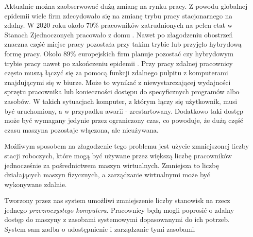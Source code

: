 \documentclass[../wstep.tex]{subfiles}
\begin{document}
Aktualnie można zaobserwować dużą zmianę na rynku pracy.
Z powodu globalnej epidemii wiele firm zdecydowało się na zmianę trybu pracy stacjonarnego na zdalny. W 2020 roku około $70\%$ pracowników zatrudnionych na pełen etat w Stanach Zjednoczonych pracowało z domu \parencite{remote-2020}.
Nawet po złagodzeniu obostrzeń znaczna część miejsc pracy pozostała przy takim trybie lub przyjęło hybrydową formę pracy. Około $89\%$ europejskich firm planuje pozostać czy hybrydowym trybie pracy nawet po zakończeniu epidemii \parencite{remote-2021}.
Przy pracy zdalnej pracownicy często muszą łączyć się za pomocą funkcji zdalnego pulpitu z komputerami znajdującymi się w biurze.
Może to wynikać z niewystarczającej wydajności sprzętu pracownika lub konieczności dostępu do specyficznych programów albo zasobów.
W takich sytuacjach komputer, z którym łączy się użytkownik, musi być uruchomiony, a w przypadku awarii - zrestartowany.
Dodatkowo taki dostęp może być wymagany jedynie przez ograniczony czas, co powoduje, że dużą część czasu maszyna pozostaje włączona, ale nieużywana.

Możliwym sposobem na złagodzenie tego problemu jest użycie zmniejszonej liczby stacji roboczych, które mogą być używane przez większą liczbę pracowników jednocześnie za pośrednictwem maszyn wirtualnych.
Zmniejsza to liczbę działających maszyn fizycznych, a zarządzanie wirtualnymi może być wykonywane zdalnie.

Tworzony przez nas system umożliwi zmniejszenie liczby stanowisk na rzecz jednego \textit{przezroczystego komputera}.
Pracownicy będą mogli poprosić o zdalny dostęp do maszyny z zasobami systemowymi dopasowanymi do ich potrzeb.
System sam zadba o udostępnienie i zarządzanie tymi zasobami.
\end{document}
